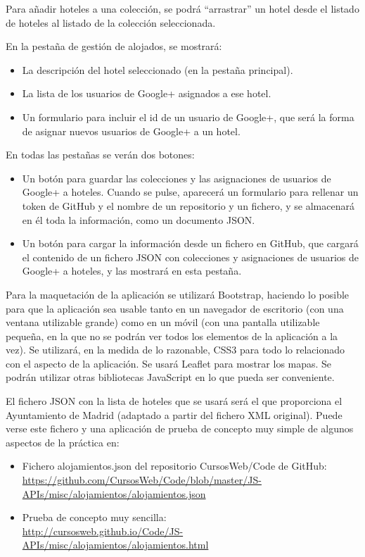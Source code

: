 Para añadir hoteles a una colección, se podrá ``arrastrar'' un hotel desde el listado de hoteles al listado de la colección seleccionada.

En la pestaña de gestión de alojados, se mostrará:

\begin{itemize}
  \item La descripción del hotel seleccionado (en la pestaña principal).
  \item La lista de los usuarios de Google+ asignados a ese hotel.
  \item Un formulario para incluir el id de un usuario de Google+, que será la forma de asignar nuevos usuarios de Google+ a un hotel.
\end{itemize}

En todas las pestañas se verán dos botones:

\begin{itemize}
  \item Un botón para guardar las colecciones y las asignaciones de usuarios de Google+ a hoteles. Cuando se pulse, aparecerá un formulario para rellenar un token de GitHub y el nombre de un repositorio y un fichero, y se almacenará en él toda la información, como un documento JSON.
  \item Un botón para cargar la información desde un fichero en GitHub, que cargará el contenido de un fichero JSON con colecciones y asignaciones de usuarios de Google+ a hoteles, y las mostrará en esta pestaña.
\end{itemize}

Para la maquetación de la aplicación se utilizará Bootstrap, haciendo lo posible para que la aplicación sea usable tanto en un navegador de escritorio (con una ventana utilizable grande) como en un móvil (con una pantalla utilizable pequeña, en la que no se podrán ver todos los elementos de la aplicación a la vez). Se utilizará, en la medida de lo razonable, CSS3 para todo lo relacionado con el aspecto de la aplicación. Se usará Leaflet para mostrar los mapas. Se podrán utilizar otras bibliotecas JavaScript en lo que pueda ser conveniente.

El fichero JSON con la lista de hoteles que se usará será el que proporciona el Ayuntamiento de Madrid (adaptado a partir del fichero XML original). Puede verse este fichero y una aplicación de prueba de concepto muy simple de algunos aspectos de la práctica en:

\begin{itemize}
  \item Fichero alojamientos.json del repositorio CursosWeb/Code de GitHub: \\
  \url{https://github.com/CursosWeb/Code/blob/master/JS-APIs/misc/alojamientos/alojamientos.json}
  \item Prueba de concepto muy sencilla: \\
  \url{http://cursosweb.github.io/Code/JS-APIs/misc/alojamientos/alojamientos.html}
\end{itemize}

